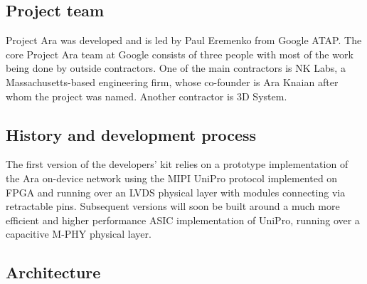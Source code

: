 \subsection{Project team}

Project Ara was developed and is led by Paul Eremenko from Google ATAP. The core Project Ara team at Google consists of three people with most of the work being done by outside contractors. One of the main contractors is NK Labs, a Massachusetts-based engineering firm, whose co-founder is Ara Knaian after whom the project was named. Another contractor is 3D System.

\subsection{History and development process}

The first version of the developers' kit relies on a prototype implementation of the Ara on-device network using the MIPI UniPro protocol implemented on FPGA and running over an LVDS physical layer with modules connecting via retractable pins. Subsequent versions will soon be built around a much more efficient and higher performance ASIC implementation of UniPro, running over a capacitive M-PHY physical layer.


         
\subsection{Architecture}